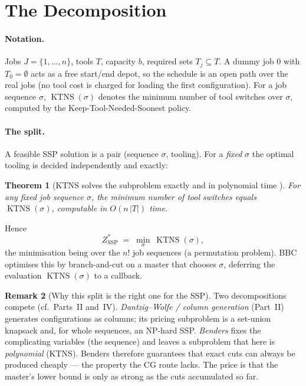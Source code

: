 \documentclass[11pt,a4paper]{article}
\theoremstyle{plain}
\newtheorem{theorem}{Theorem}[section]
\theoremstyle{definition}
\newtheorem{remark}[theorem]{Remark}
\DeclareMathOperator{\KTNS}{KTNS}
\newcommand{\ZSSP}{Z_{\mathrm{SSP}}^{*}}
\begin{document}
\vspace{0.3cm}
\tableofcontents
\newpage

\section{The Decomposition}
\label{sec:decomp}

\paragraph{Notation.} Jobs $J=\{1,\dots,n\}$, tools $T$, capacity $b$, required sets
$T_j\subseteq T$. A dummy job $0$ with $T_0=\emptyset$ acts as a free start/end depot, so the
schedule is an open path over the real jobs (no tool cost is charged for loading the first
configuration). For a job sequence $\sigma$, $\KTNS(\sigma)$ denotes the minimum number of
tool switches over $\sigma$, computed by the Keep-Tool-Needed-Soonest policy.

\paragraph{The split.} A feasible SSP solution is a pair (sequence $\sigma$, tooling). For a
\emph{fixed} $\sigma$ the optimal tooling is decided independently and exactly:

\begin{thmbox}
\begin{theorem}[KTNS solves the subproblem exactly and in polynomial time \cite{Tang1988}]
\label{thm:ktns}
For any fixed job sequence $\sigma$, the minimum number of tool switches equals
$\KTNS(\sigma)$, computable in $O(n\,|T|)$ time.
\end{theorem}
\end{thmbox}

Hence
\[
  \ZSSP \;=\; \min_{\sigma}\ \KTNS(\sigma),
\]
the minimisation being over the $n!$ job sequences (a permutation problem). BBC optimises
this by branch-and-cut on a master that chooses $\sigma$, deferring the evaluation
$\KTNS(\sigma)$ to a callback.

\begin{remark}[Why this split is the right one for the SSP]
Two decompositions compete (cf.\ Parts~II and~IV). \emph{Dantzig--Wolfe / column generation}
(Part~II) generates configurations as columns; its pricing subproblem is a set-union knapsack
and, for whole sequences, an NP-hard SSP. \emph{Benders} fixes the complicating variables
(the sequence) and leaves a subproblem that here is \emph{polynomial} (KTNS). Benders
therefore guarantees that exact cuts can always be produced cheaply --- the property the CG
route lacks. The price is that the master's lower bound is only as strong as the cuts
accumulated so far.
\end{remark}
\end{document}
